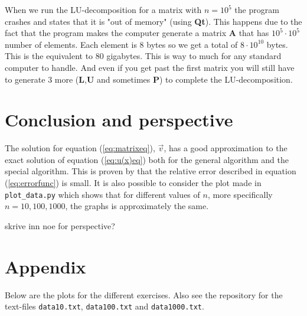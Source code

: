 \documentclass{article}
\begin{document}
  When we run the LU-decomposition for a matrix with $n = 10^5$ the program crashes and states that it is "out of memory" (using \textbf{Qt}). This happens due to the fact that the program makes the computer generate a matrix \textbf{A} that has $10^5 \cdot 10^5$ number of elements. Each element is 8 bytes so we get a total of $8 \cdot 10^{10}$ bytes. This is the equivalent to $80$ gigabytes. This is way to much for any standard computer to handle. And even if you get past the first matrix you will still have to generate 3 more (\textbf{L},\textbf{U} and sometimes \textbf{P}) to complete the LU-decomposition.



\vspace{1cm}

\section{Conclusion and perspective} \label{sec:Conclusion}

  The solution for equation (\ref{eq:matrixeq}), $\vec{v}$, has a good approximation to the exact solution of equation (\ref{eq:u(x)eq}) both for the general algorithm and the special algorithm. This is proven by that the relative error described in equation (\ref{eq:errorfunc}) is small. It is also possible to consider the plot made in \texttt{plot\_data.py} which shows that for different values of $n$, more specifically $n = 10, 100, 1000$, the graphs is approximately the same.

  {\large skrive inn noe for perspective? }


\vspace{1cm}

\section{Appendix} \label{sec:Appendix}

Below are the plots for the different exercises. Also see the repository for the text-files \texttt{data10.txt}, \texttt{data100.txt} and \texttt{data1000.txt}.
\end{document}
